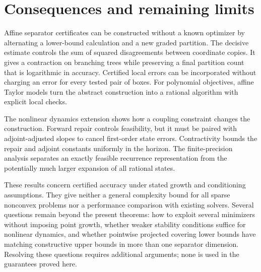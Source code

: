 \section{Consequences and remaining limits}\label{sec:conclusion}
Affine separator certificates can be constructed without a known
optimizer by alternating a lower-bound calculation and a new graded
partition. The decisive estimate controls the sum of squared disagreements
between coordinate copies. It gives a contraction on branching trees
while preserving a final partition count that is logarithmic in accuracy.
Certified local errors can be incorporated without charging an error for
every tested pair of boxes. For polynomial objectives, affine Taylor
models turn the abstract construction into a rational algorithm with
explicit local checks.

The nonlinear dynamics extension shows how a coupling constraint changes
the construction. Forward repair controls feasibility, but it must be
paired with adjoint-adjusted slopes to cancel first-order state errors.
Contractivity bounds the repair and adjoint constants uniformly in the
horizon. The finite-precision analysis separates an exactly feasible
recurrence representation from the potentially much larger expansion of
all rational states.

These results concern certified accuracy under stated growth and
conditioning assumptions. They give neither a general complexity bound
for all sparse nonconvex problems nor a performance comparison with
existing solvers. Several questions remain beyond the present theorems:
how to exploit several minimizers without imposing point growth, whether
weaker stability conditions suffice for nonlinear dynamics, and whether
pointwise projected covering lower bounds have matching constructive
upper bounds in more than one separator dimension. Resolving these
questions requires additional arguments; none is used in the guarantees
proved here.
